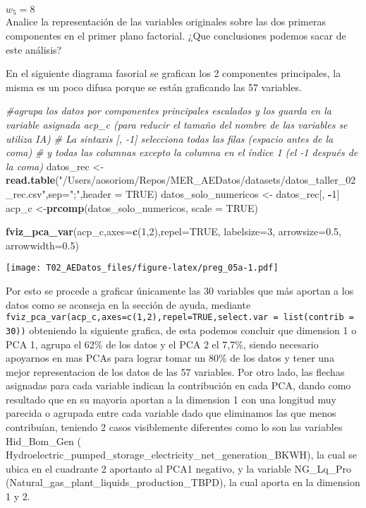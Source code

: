\documentclass[
]{article}
\newenvironment{Shaded}{\begin{snugshade}}{\end{snugshade}}
\newcommand{\AttributeTok}[1]{\textcolor[rgb]{0.13,0.29,0.53}{#1}}
\newcommand{\CommentTok}[1]{\textcolor[rgb]{0.56,0.35,0.01}{\textit{#1}}}
\newcommand{\ConstantTok}[1]{\textcolor[rgb]{0.56,0.35,0.01}{#1}}
\newcommand{\DecValTok}[1]{\textcolor[rgb]{0.00,0.00,0.81}{#1}}
\newcommand{\FloatTok}[1]{\textcolor[rgb]{0.00,0.00,0.81}{#1}}
\newcommand{\FunctionTok}[1]{\textcolor[rgb]{0.13,0.29,0.53}{\textbf{#1}}}
\newcommand{\NormalTok}[1]{#1}
\newcommand{\OtherTok}[1]{\textcolor[rgb]{0.56,0.35,0.01}{#1}}
\newcommand{\SpecialCharTok}[1]{\textcolor[rgb]{0.81,0.36,0.00}{\textbf{#1}}}
\newcommand{\StringTok}[1]{\textcolor[rgb]{0.31,0.60,0.02}{#1}}
\begin{document}
\(w_5=8\)\\
Analice la representación de las variables originales sobre las dos
primeras componentes en el primer plano factorial. ¿Que conclusiones
podemos sacar de este análisis?

En el siguiente diagrama fasorial se grafican los 2 componentes
principales, la misma es un poco difusa porque se están graficando las
57 variables.

\begin{Shaded}
\begin{Highlighting}[]
\CommentTok{\#agrupa los datos por componentes principales escalados y los guarda en la variable asignada acp\_c (para reducir el tamaño del nombre de las variables se utiliza IA)}
\CommentTok{\# La sintaxis [, {-}1] selecciona todas las filas (espacio antes de la coma)}
\CommentTok{\# y todas las columnas excepto la columna en el índice 1 (el {-}1 después de la coma)}
\NormalTok{datos\_rec }\OtherTok{\textless{}{-}} \FunctionTok{read.table}\NormalTok{(}\StringTok{"/Users/aosoriom/Repos/MER\_AEDatos/datasets/datos\_taller\_02\_rec.csv"}\NormalTok{,}\AttributeTok{sep=}\StringTok{";"}\NormalTok{,}\AttributeTok{header =} \ConstantTok{TRUE}\NormalTok{)}
\NormalTok{datos\_solo\_numericos }\OtherTok{\textless{}{-}}\NormalTok{ datos\_rec[, }\SpecialCharTok{{-}}\DecValTok{1}\NormalTok{]}
\NormalTok{acp\_c }\OtherTok{\textless{}{-}}\FunctionTok{prcomp}\NormalTok{(datos\_solo\_numericos, }\AttributeTok{scale =} \ConstantTok{TRUE}\NormalTok{)}

\FunctionTok{fviz\_pca\_var}\NormalTok{(acp\_c,}\AttributeTok{axes=}\FunctionTok{c}\NormalTok{(}\DecValTok{1}\NormalTok{,}\DecValTok{2}\NormalTok{),}\AttributeTok{repel=}\ConstantTok{TRUE}\NormalTok{, }\AttributeTok{labelsize=}\DecValTok{3}\NormalTok{, }\AttributeTok{arrowsize=}\FloatTok{0.5}\NormalTok{, }\AttributeTok{arrowwidth=}\FloatTok{0.5}\NormalTok{)}
\end{Highlighting}
\end{Shaded}

\texttt{[image: T02\_AEDatos\_files/figure-latex/preg\_05a-1.pdf]}

Por esto se procede a graficar únicamente las 30 variables que más
aportan a los datos como se aconseja en la sección de ayuda, mediante
\texttt{fviz\_pca\_var(acp\_c,axes=c(1,2),repel=TRUE,select.var\ =\ list(contrib\ =\ 30))}
obteniendo la siguiente grafica, de esta podemos concluir que dimension
1 o PCA 1, agrupa el 62\% de los datos y el PCA 2 el 7,7\%, siendo
necesario apoyarnos en mas PCAs para lograr tomar un 80\% de los datos y
tener una mejor representacion de los datos de las 57 variables. Por
otro lado, las flechas asignadas para cada variable indican la
contribución en cada PCA, dando como resultado que en su mayoria aportan
a la dimension 1 con una longitud muy parecida o agrupada entre cada
variable dado que eliminamos las que menos contribuían, teniendo 2 casos
visiblemente diferentes como lo son las variables Hid\_Bom\_Gen (
Hydroelectric\_pumped\_storage\_electricity\_net\_generation\_BKWH), la
cual se ubica en el cuadrante 2 aportanto al PCA1 negativo, y la
variable NG\_Lq\_Pro (Natural\_gas\_plant\_liquids\_production\_TBPD),
la cual aporta en la dimension 1 y 2.
\end{document}
